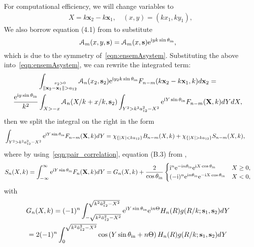 \documentclass[12pt, a4paper]{article}
\begin{document}
For computational efficiency, we will change variables to
\begin{align}
& X = k\mathbf x_2 - k\mathbf x_1, \quad (x,y) = (kx_1,ky_1),
\end{align}
We also borrow equation (4.1) from \parencite{gower_reflection_2018} to substitute
\[
\mathcal A_m (x, y, \mathbf s) = \mathcal A_m (x, \mathbf s) \textrm{e}^{\textrm{i} y k \sin\theta_{\mathrm{in}}},
\]
which is due to the symmetry of~\eqref{eqn:ensemAsystem}. Substituting the above into~\eqref{eqn:ensemAsystem}, we can rewrite the integrated term:
\begin{multline*}
     \int_{\stackrel{x_2 > 0 }{\|\mathbf x_2-\mathbf x_1 \| > a_{12}}} \mathcal A_n (x_2, \mathbf s_2) \textrm{e}^{\textrm{i} y_2 k \sin\theta_{\mathrm{in}}} F_{n-m}(k\mathbf x_2 - k \mathbf x_1,k) d \mathbf x_2 =
  \\
   \frac{\textrm{e}^{\textrm{i} y \sin\theta_{\mathrm{in}}}}{k^2} \int_{X> -x} \mathcal A_n (X/k + x/k, \mathbf s_2) \int_{Y^2 > k^2 a_{12}^2 - X^2}
   \textrm{e}^{\textrm{i} Y \sin\theta_{\mathrm{in}}} F_{n-m}(\mathbf X,k) d Y d X,
\end{multline*}
then we split the integral on the right in the form
\begin{align*}
  &\int_{Y^2 > k^2 a_{12}^2 - X^2} \ee^{\ii Y \sin\theta_\inc} F_{n-m}(\mathbf X,k) d Y
 = \chi_{\{ |X|< k a_{12}\}} B_{n-m}(X,k)
   +  \chi_{\{ |X|> k a_{12}\}}S_{n-m}(X,k),
\end{align*}
where by using~\eqref{eqn:pair_correlation}, equation (B.3) from \cite{gower_reflection_2018},
\begin{equation}
  S_n(X,k) =  \int_{-\infty}^\infty \textrm{e}^{\textrm{i} Y \sin\theta_{\mathrm{in}}}
  F_{n}(\mathbf X,k) d Y =
G_{n}(X, k) +
\frac{2}{\cos \theta_{\mathrm{in}}}
\begin{cases}
  \textrm{i}^{n} \textrm{e}^{-\textrm{i} n \theta_{\mathrm{in}}} \textrm{e}^{\textrm{i} X \cos \theta_{\mathrm{in}} } & X \geq 0,\\
  (-\textrm{i})^{n} \textrm{e}^{\textrm{i} n \theta_{\mathrm{in}}} \textrm{e}^{-\textrm{i} X \cos \theta_{\mathrm{in}} } & X < 0,
\end{cases}
\end{equation}
 with
\begin{multline}
G_n(X, k) = (-1)^{n} \int_{-\sqrt{k^2 \bar a_{12}^2 - X^2}}^{\sqrt{k^2\bar a_{12}^2 - X^2}} \textrm{e}^{\textrm{i} Y \sin\theta_{\mathrm{in}}}
  \textrm{e}^{\textrm{i} n \Theta} H_{n}(R)g(R/k;  \mathbf s_1,\mathbf s_2) d Y
  \\ = 2 (-1)^{n} \int_{0}^{\sqrt{k^2\bar a_{12}^2 - X^2}} \cos\left(Y \sin\theta_{\mathrm{in}} + n \Theta\right) H_{n}(R)g(R/k;  \mathbf s_1,\mathbf s_2) d Y
\end{multline}
\end{document}
